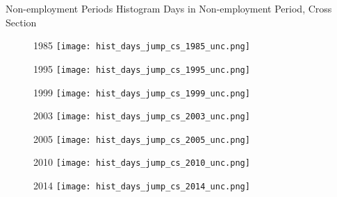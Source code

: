 \documentclass[hyperref={bookmarks=false}]{beamer}
\begin{document}
\begin{appendix}
\begin{frame}{Non-employment Periods}
Histogram Days in Non-employment Period, Cross Section
\begin{figure}[!t]
\centering
\begin{minipage}[b]{0.3\textwidth}{1985}
\centering
\texttt{[image: hist\_days\_jump\_cs\_1985\_unc.png]}
\end{minipage}
\begin{minipage}[b]{0.30\textwidth}{1995}
\centering
\texttt{[image: hist\_days\_jump\_cs\_1995\_unc.png]}
\end{minipage}
\begin{minipage}[b]{0.30\textwidth}{1999}
\centering
\texttt{[image: hist\_days\_jump\_cs\_1999\_unc.png]}
\end{minipage}
\begin{minipage}[b]{0.30\textwidth}{2003}
\centering
\texttt{[image: hist\_days\_jump\_cs\_2003\_unc.png]}
\end{minipage}
\begin{minipage}[b]{0.30\textwidth}{2005}
\centering
\texttt{[image: hist\_days\_jump\_cs\_2005\_unc.png]}
\end{minipage}
\begin{minipage}[b]{0.30\textwidth}{2010}
\centering
\texttt{[image: hist\_days\_jump\_cs\_2010\_unc.png]}
\end{minipage}
\begin{minipage}[b]{0.30\textwidth}{2014}
\centering
\texttt{[image: hist\_days\_jump\_cs\_2014\_unc.png]}
\end{minipage}
\end{figure}
\end{frame}


\end{appendix}
\end{document}
